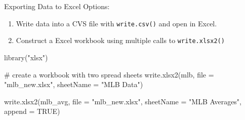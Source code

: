 \documentclass[
  9pt,
  ignorenonframetext,
]{beamer}
\newenvironment{Shaded}{\begin{snugshade}}{\end{snugshade}}
\newcommand{\CommentTok}[1]{\textcolor[rgb]{0.50,0.62,0.50}{#1}}
\newcommand{\DataTypeTok}[1]{\textcolor[rgb]{0.87,0.87,0.75}{#1}}
\newcommand{\KeywordTok}[1]{\textcolor[rgb]{0.94,0.87,0.69}{#1}}
\newcommand{\NormalTok}[1]{\textcolor[rgb]{0.80,0.80,0.80}{#1}}
\newcommand{\OtherTok}[1]{\textcolor[rgb]{0.94,0.94,0.56}{#1}}
\newcommand{\StringTok}[1]{\textcolor[rgb]{0.80,0.58,0.58}{#1}}
\begin{document}
\begin{frame}[fragile]{Exporting Data to Excel}
\protect\hypertarget{exporting-data-to-excel}{}
Options:

\begin{enumerate}
\item
  Write data into a CVS file with \texttt{write.csv()} and open in
  Excel.
\item
  Construct a Excel workbook using multiple calls to
  \texttt{write.xlsx2()}
\end{enumerate}

\vfill

\begin{Shaded}
\begin{Highlighting}[]
\KeywordTok{library}\NormalTok{(}\StringTok{"xlsx"}\NormalTok{)}

\CommentTok{\# create a workbook with two spread sheets}
\KeywordTok{write.xlsx2}\NormalTok{(mlb, }\DataTypeTok{file =} \StringTok{"mlb\_new.xlsx"}\NormalTok{, }
  \DataTypeTok{sheetName =} \StringTok{"MLB Data"}\NormalTok{)}

\KeywordTok{write.xlsx2}\NormalTok{(mlb\_avg, }\DataTypeTok{file =} \StringTok{"mlb\_new.xlsx"}\NormalTok{, }
  \DataTypeTok{sheetName =} \StringTok{"MLB Averages"}\NormalTok{, }\DataTypeTok{append =} \OtherTok{TRUE}\NormalTok{)}
\end{Highlighting}
\end{Shaded}
\end{frame}
\end{document}
